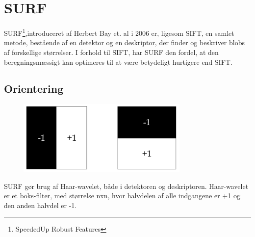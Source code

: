 \section{SURF}
SURF\footnote{SpeededUp Robust Features},introduceret af Herbert Bay et. al \cite{SURF} i 2006 er, ligesom SIFT, en samlet metode, bestående af en detektor og en deskriptor, der finder og beskriver blobs af forskellige størrelser. I forhold til SIFT, har SURF den fordel, at den beregningsmæssigt kan optimeres til at være betydeligt hurtigere end SIFT.

\subsection{Orientering}
\begin{figure}[H]
    \centering
    \includegraphics[width=0.75\textwidth]{fig/haarwavelet.png}
     \vspace{-1em}
    \begin{center}    
       \caption{\textcolor{gray}{\footnotesize \textit{ }}}
    \label{fig:haarwavelet}
     \end{center}
     \vspace{-2.5em}
  \end{figure} \noindent
SURF gør brug af Haar-wavelet, både i detektoren og deskriptoren. Haar-wavelet er et boks-filter, med størrelse nxn, hvor halvdelen af alle indgangene er +1 og den anden halvdel er -1.
